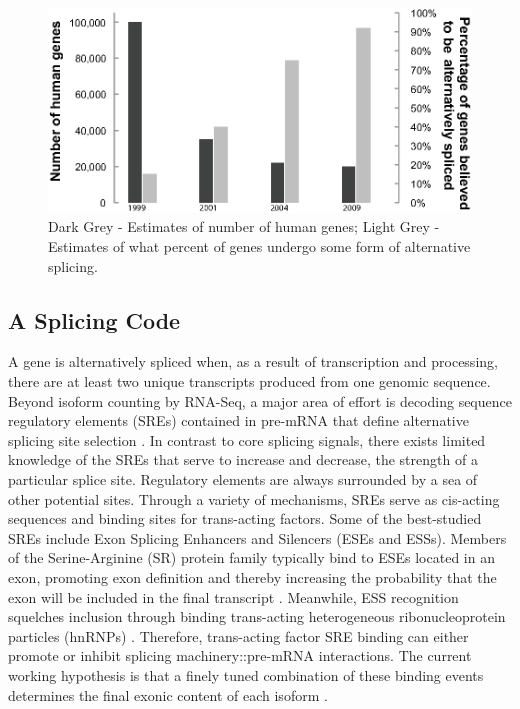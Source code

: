     \begin{figure} %
      \centering 
      \includegraphics{Figures/Intro/numberHumanGenesAndNumberSpliced}
      \caption[Estimates of number of human genes, and percentage alternatively spliced over time]
      {
      Dark Grey - Estimates of number of human genes; Light Grey - Estimates of what percent of genes undergo some form of alternative splicing.
      }
      \label{Intro:fig:numGenesAndNumSpliced}
      \end{figure}

  \subsection{A Splicing Code}\label{Intro:subsec:Splicing Code}

    A gene is alternatively spliced when, as a result of transcription and processing, there are at least two unique transcripts produced from one genomic sequence. Beyond isoform counting by RNA-Seq, a major area of effort is decoding sequence regulatory elements (SREs) contained in pre-mRNA that define alternative splicing site selection \citep{Wang2008}. In contrast to core splicing signals, there exists limited knowledge of the SREs that serve to increase and decrease, the strength of a particular splice site. Regulatory elements are always surrounded by a sea of other potential sites. Through a variety of mechanisms, SREs serve as cis-acting sequences and binding sites for trans-acting factors. Some of the best-studied SREs include Exon Splicing Enhancers and Silencers (ESEs and ESSs). Members of the Serine-Arginine (SR) protein family typically bind to ESEs located in an exon, promoting exon definition and thereby increasing the probability that the exon will be included in the final transcript \citep{Graveley2000,Long2009}. Meanwhile, ESS recognition  squelches inclusion through binding trans-acting heterogeneous ribonucleoprotein particles (hnRNPs) \citep{Martinez-Contreras2007}. Therefore, trans-acting factor SRE binding can either promote or inhibit splicing machinery::pre-mRNA interactions. The current working hypothesis is that a finely tuned combination of these binding events determines the final exonic content of each isoform \citep{House2008}.

